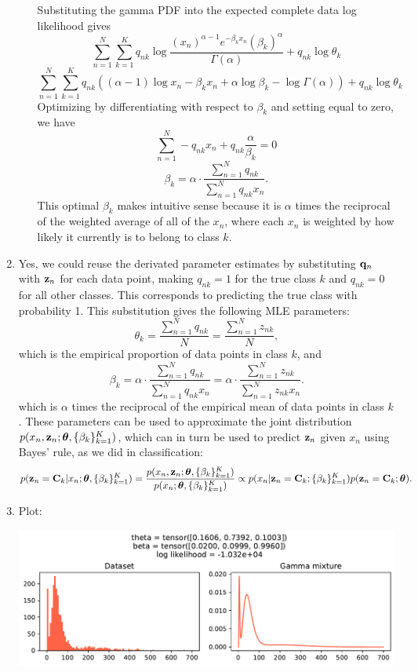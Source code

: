 \documentclass[submit]{harvardml}
\begin{document}
\begin{enumerate}
\begin{enumerate}
      Substituting the gamma PDF into the expected complete data log likelihood gives
	  $$\sum_{n=1}^N \sum_{k=1}^K q_{nk} \log \frac{(x_n)^{\alpha-1}e^{-\beta_k x_n}(\beta_k)^\alpha}{\Gamma(\alpha)} + q_{nk} \log \theta_k$$
	  $$\sum_{n=1}^N \sum_{k=1}^K q_{nk} \left((\alpha - 1)\log x_n - \beta_kx_n + \alpha \log \beta_k - \log \Gamma(\alpha)\right)+ q_{nk} \log \theta_k$$
	  Optimizing by differentiating with respect to $\beta_k$ and setting equal to zero, we have
	  $$\sum_{n=1}^N -q_{nk} x_n + q_{nk} \frac{\alpha}{\beta_k} = 0$$
	  $$\beta_k = \alpha \cdot \frac{\sum_{n=1}^N q_{nk}}{\sum_{n=1}^N q_{nk} x_n}.$$
	  This optimal $\beta_k$ makes intuitive sense because it is $\alpha$ times the reciprocal of the weighted average of all of the $x_n$, where each $x_n$ is weighted by how likely it currently is to belong to class $k$.

    \end{enumerate}
  \item 
  Yes, we could reuse the derivated parameter estimates by substituting $\mathbf{q}_n$ with $\mathbf{z}_n$ for each data point, making $q_{nk}=1$ for the true class $k$ and $q_{nk}=0$ for all other classes. This corresponds to predicting the true class with probability 1. This substitution gives the following MLE parameters:
  $$\theta_k = \frac{\sum_{n=1}^N q_{nk}}{N} =  \frac{\sum_{n=1}^N z_{nk}}{N},$$
  which is the empirical proportion of data points in class $k$, and
  $$\beta_k = \alpha \cdot \frac{\sum_{n=1}^N q_{nk}}{\sum_{n=1}^N q_{nk} x_n} = \alpha \cdot \frac{\sum_{n=1}^N z_{nk}}{\sum_{n=1}^N z_{nk} x_n}.$$
  which is $\alpha$ times the reciprocal of the empirical mean of data points in class $k$. These parameters can be used to approximate the joint distribution $p(x_n, \mathbf{z}_n; \boldsymbol{\theta}, \{\beta_k\}^K_{k = 1})$, which can in turn be used to predict $\mathbf{z}_n$ given $x_n$ using Bayes' rule, as we did in classification:
  $$p(\mathbf{z}_n = \mathbf{C}_k | x_n; \boldsymbol{\theta}, \{\beta_k\}^K_{k = 1}) = \frac{p(x_n, \mathbf{z}_n; \boldsymbol{\theta}, \{\beta_k\}^K_{k = 1})}{p(x_n; \boldsymbol{\theta}, \{\beta_k\}^K_{k = 1})} \propto p(x_n | \mathbf{z}_n = \mathbf{C}_k; \{\beta_k\}^K_{k = 1})p(\mathbf{z}_n = \mathbf{C}_k; \boldsymbol{\theta}).$$
  
  \item 
    Plot:

    \includegraphics[width=\linewidth]{p1}


\end{enumerate}
\end{document}
